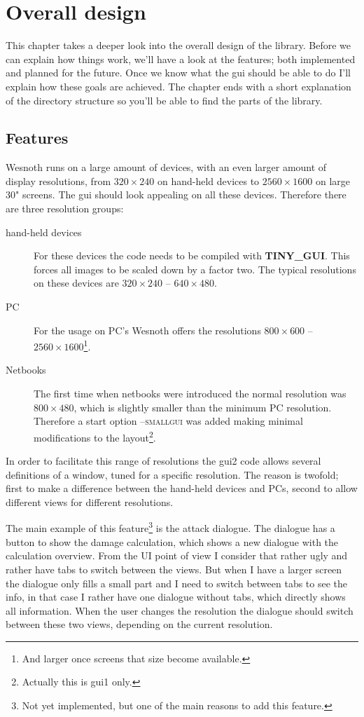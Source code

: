 \chapter{Overall design}

This chapter takes a deeper look into the overall design of the library. Before
we can explain how things work, we'll have a look at the features; both
implemented and planned for the future. Once we know what the gui should be able
to do I'll explain how these goals are achieved. The chapter ends with a short
explanation of the directory structure so you'll be able to find the parts of
the library.

\section{Features}

Wesnoth runs on a large amount of devices, with an even larger amount of display
resolutions, from $320\times 240$ on hand-held devices to $2560\times 1600$ on
large 30" screens. The gui should look appealing on all these devices. Therefore
there are three resolution groups:
\begin{description}
\item[hand-held devices] For these devices the code needs to be compiled with
\textbf{TINY\_GUI}. This forces all images to be scaled down by a factor two.
	The typical resolutions on these devices are $320\times 240$ -- $640\times
	480$.
\item[PC] For the usage on PC's Wesnoth offers the resolutions $800\times 600$
	-- $2560\times 1600$\footnote{And larger once screens that size become
	available.}.
\item[Netbooks] The first time when netbooks were introduced the normal resolution
	was $800\times 480$, which is slightly smaller than the minimum PC resolution.
	Therefore a start option \textsc{--smallgui} was added making minimal
	modifications to the layout\footnote{Actually this is gui1 only.}.
\end{description}

In order to facilitate this range of resolutions the gui2 code allows several
definitions of a window, tuned for a specific resolution. The reason is twofold;
first to make a difference between the hand-held devices and PCs, second to allow
different views for different resolutions.

The main example of this feature\footnote{Not yet implemented, but one of the
main reasons to add this feature.} is the attack dialogue. The dialogue has a
button to show the damage calculation, which shows a new dialogue with the
calculation overview. From the UI point of view I consider that rather ugly and
rather have tabs to switch between the views. But when I have a larger screen the
dialogue only fills a small part and I need to switch between tabs to see the
info, in that case I rather have one dialogue without tabs, which directly shows
all information. When the user changes the resolution the dialogue should switch
between these two views, depending on the current resolution.


